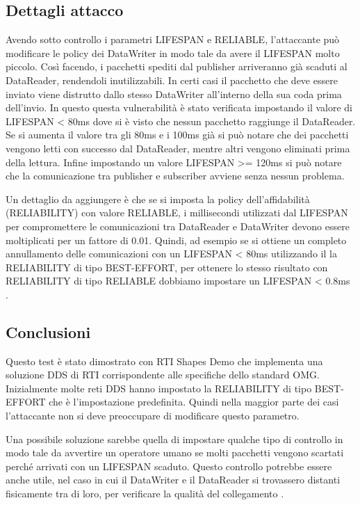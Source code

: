 

\subsection{Dettagli attacco}
Avendo sotto controllo i parametri LIFESPAN e RELIABLE, l'attaccante può modificare le
policy dei DataWriter in modo tale da avere il LIFESPAN molto piccolo. Così
facendo, i pacchetti spediti dal publisher arriveranno già scaduti al DataReader,
rendendoli inutilizzabili. In certi casi il pacchetto che deve essere inviato
viene distrutto dallo stesso DataWriter all'interno della sua coda prima dell'invio. 
In questo questa vulnerabilità è stato verificata impostando il valore di
LIFESPAN < 80ms dove si è visto che nessun pacchetto raggiunge il DataReader.
Se si aumenta il valore tra gli 80ms e i 100ms già si può notare che dei pacchetti
vengono letti con successo dal DataReader, mentre altri vengono eliminati prima
della lettura. Infine impostando un valore LIFESPAN >= 120ms si può notare che
la comunicazione tra publisher e subscriber avviene senza nessun problema.

Un dettaglio da aggiungere è che se si imposta la policy
dell'affidabilità (RELIABILITY) con valore RELIABLE, i millisecondi utilizzati
dal LIFESPAN per compromettere le comunicazioni tra DataReader e DataWriter
devono essere moltiplicati per un fattore di 0.01. Quindi, ad esempio se si
ottiene un completo annullamento delle comunicazioni con un LIFESPAN < 80ms
utilizzando il la RELIABILITY di tipo BEST-EFFORT, per ottenere lo stesso
risultato con RELIABILITY di tipo RELIABLE dobbiamo impostare un
LIFESPAN < 0.8ms
\cite{DBLP:conf/malware/MichaudDL18}.

\subsection{Conclusioni}
Questo test è stato dimostrato con RTI Shapes Demo che 
implementa una
soluzione DDS di RTI corrispondente alle specifiche dello standard OMG.
Inizialmente molte reti DDS hanno impostato la RELIABILITY
di tipo BEST-EFFORT che è l'impostazione predefinita. Quindi nella maggior parte
dei casi l'attaccante non si deve preoccupare di modificare questo parametro.

Una possibile soluzione sarebbe quella di impostare qualche tipo di controllo
in modo tale da avvertire un operatore umano se molti pacchetti vengono
scartati perché arrivati con un LIFESPAN scaduto. Questo controllo potrebbe
essere anche utile, nel caso in cui il DataWriter e il DataReader si trovassero
distanti fisicamente tra di loro, per verificare la qualità del collegamento
\cite{DBLP:conf/malware/MichaudDL18}.



